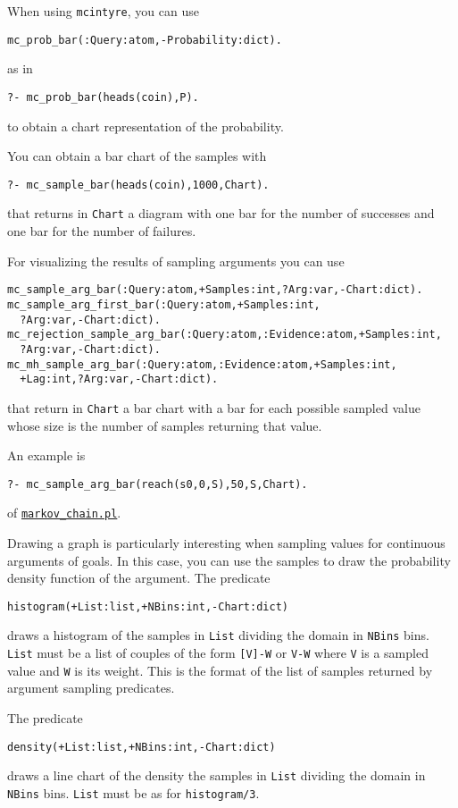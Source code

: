When using \verb|mcintyre|, you can use
\begin{verbatim}
mc_prob_bar(:Query:atom,-Probability:dict).
\end{verbatim}
as in
\begin{verbatim}
?- mc_prob_bar(heads(coin),P).
\end{verbatim}
to obtain a chart representation of the probability.

You can obtain a bar chart of the samples with
\begin{verbatim}
?- mc_sample_bar(heads(coin),1000,Chart).
\end{verbatim}
that returns in \verb|Chart| a diagram with one bar for the number of successes and 
one bar for the number of failures.

For visualizing the results of sampling arguments you can use
\begin{verbatim}
mc_sample_arg_bar(:Query:atom,+Samples:int,?Arg:var,-Chart:dict).
mc_sample_arg_first_bar(:Query:atom,+Samples:int,
  ?Arg:var,-Chart:dict).
mc_rejection_sample_arg_bar(:Query:atom,:Evidence:atom,+Samples:int,
  ?Arg:var,-Chart:dict).
mc_mh_sample_arg_bar(:Query:atom,:Evidence:atom,+Samples:int,
  +Lag:int,?Arg:var,-Chart:dict).
\end{verbatim} 
that return in \verb|Chart| a bar chart with a bar for each possible sampled value whose size is the number of samples
returning that value.

An example is
\begin{verbatim}
?- mc_sample_arg_bar(reach(s0,0,S),50,S,Chart). 
\end{verbatim}
of \href{http://cplint.lamping.unife.it/example/inference/markov_chain.pl}{\texttt{markov\_chain.pl}}.

Drawing a graph is particularly interesting when
sampling values for continuous arguments of goals.
In this case, you can use the samples to draw the
probability density function of the argument.
The predicate
\begin{verbatim}
histogram(+List:list,+NBins:int,-Chart:dict) 
\end{verbatim}
draws a histogram of the samples in \verb|List| dividing the domain in
 \verb|NBins| bins.
\verb|List| must be a list of couples of the form \verb|[V]-W| or  \verb|V-W|
where \verb|V| is a sampled value and \verb|W| is its weight. This is the format of the list of samples returned by argument sampling predicates.

The predicate
\begin{verbatim}
density(+List:list,+NBins:int,-Chart:dict) 
\end{verbatim}
draws a line chart of the density the samples in \verb|List| dividing the domain in
 \verb|NBins| bins.
\verb|List| must be as for \verb|histogram/3|.

